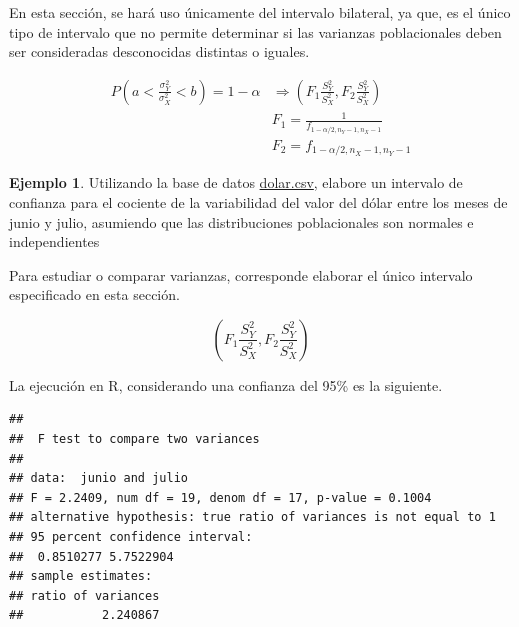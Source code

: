 \documentclass[
  11pt,
]{book}
\newenvironment{Shaded}{\begin{snugshade}}{\end{snugshade}}
\newcommand{\AttributeTok}[1]{\textcolor[rgb]{0.13,0.29,0.53}{#1}}
\newcommand{\FloatTok}[1]{\textcolor[rgb]{0.00,0.00,0.81}{#1}}
\newcommand{\FunctionTok}[1]{\textcolor[rgb]{0.13,0.29,0.53}{\textbf{#1}}}
\newcommand{\NormalTok}[1]{#1}
\newcommand{\OtherTok}[1]{\textcolor[rgb]{0.56,0.35,0.01}{#1}}
\newcommand{\SpecialCharTok}[1]{\textcolor[rgb]{0.81,0.36,0.00}{\textbf{#1}}}
\newcommand{\StringTok}[1]{\textcolor[rgb]{0.31,0.60,0.02}{#1}}
\theoremstyle{definition}
\theoremstyle{definition}
\newtheorem{example}{Ejemplo}[chapter]
\theoremstyle{definition}
\theoremstyle{definition}
\theoremstyle{remark}
\begin{document}
En esta sección, se hará uso únicamente del intervalo bilateral, ya que, es el único tipo de intervalo que no permite determinar si las varianzas poblacionales deben ser consideradas desconocidas distintas o iguales.

\begin{equation}
\begin{split}
P\left(a<\frac{\sigma_Y^2}{\sigma_X^2}<b\right) = 1-\alpha &\Rightarrow \left( F_1\frac{S_Y^2}{S_X^2},F_2\frac{S_Y^2}{S_X^2} \right)\\
& F_1 = \frac{1}{f_{1-\alpha/2,n_Y-1,n_X-1}}\\
& F_2 = f_{1-\alpha/2,n_X-1,n_Y-1}
\end{split}
\label{eq:ICvarianzas-bilateral}
\end{equation}

\begin{example}
Utilizando la base de datos \href{https://raw.githubusercontent.com/Dfranzani/Bases-de-datos-para-cursos/main/2022-2/Estad\%C3\%ADstica\%201/dolar.csv}{dolar.csv}, elabore un intervalo de confianza para el cociente de la variabilidad del valor del dólar entre los meses de junio y julio, asumiendo que las distribuciones poblacionales son normales e independientes

Para estudiar o comparar varianzas, corresponde elaborar el único intervalo especificado en esta sección.

\[\left( F_1\frac{S_Y^2}{S_X^2},F_2\frac{S_Y^2}{S_X^2} \right)\]

La ejecución en R, considerando una confianza del 95\% es la siguiente.

\begin{Shaded}
\end{Shaded}

\begin{verbatim}
## 
##  F test to compare two variances
## 
## data:  junio and julio
## F = 2.2409, num df = 19, denom df = 17, p-value = 0.1004
## alternative hypothesis: true ratio of variances is not equal to 1
## 95 percent confidence interval:
##  0.8510277 5.7522904
## sample estimates:
## ratio of variances 
##           2.240867
\end{verbatim}


\end{example}
\end{document}
